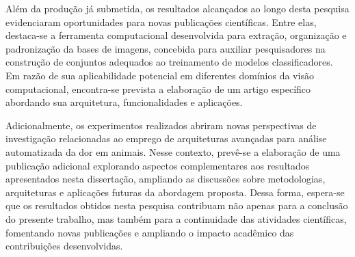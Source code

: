 Além da produção já submetida, os resultados alcançados ao longo desta pesquisa evidenciaram oportunidades para novas publicações científicas. Entre elas, destaca-se a ferramenta computacional desenvolvida para extração, organização e padronização da bases de imagens, concebida para auxiliar pesquisadores na construção de conjuntos adequados ao treinamento de modelos classificadores. Em razão de sua aplicabilidade potencial em diferentes domínios da visão computacional, encontra-se prevista a elaboração de um artigo específico abordando sua arquitetura, funcionalidades e aplicações.

Adicionalmente, os experimentos realizados abriram novas perspectivas de investigação relacionadas ao emprego de arquiteturas avançadas para análise automatizada da dor em animais. Nesse contexto, prevê-se a elaboração de uma publicação adicional explorando aspectos complementares aos resultados apresentados nesta dissertação, ampliando as discussões sobre metodologias, arquiteturas e aplicações futuras da abordagem proposta. Dessa forma, espera-se que os resultados obtidos nesta pesquisa contribuam não apenas para a conclusão do presente trabalho, mas também para a continuidade das atividades científicas, fomentando novas publicações e ampliando o impacto acadêmico das contribuições desenvolvidas.